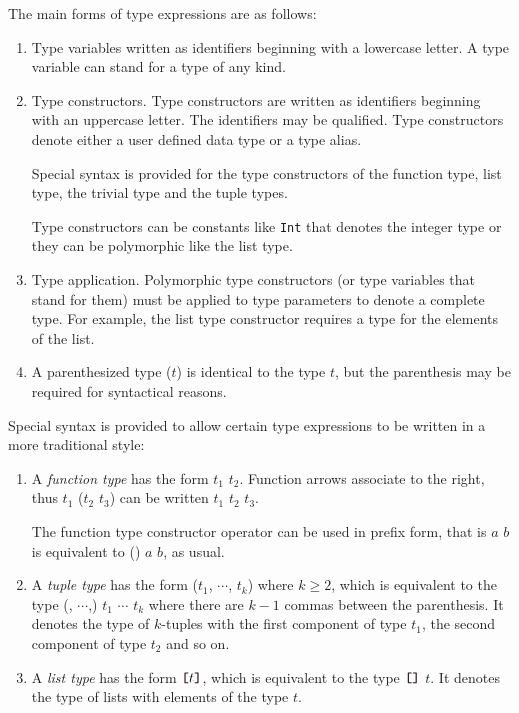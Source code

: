 The main forms of type expressions are as follows:

\begin{enumerate}
\item Type variables written as identifiers beginning with a lowercase letter.  A type variable can stand for a type of any kind.
\item Type constructors. Type constructors are written as identifiers beginning with an uppercase letter. The identifiers may be qualified. Type constructors denote either a user defined data type or a type alias.

Special syntax is provided for the type constructors of the function type, list type, the trivial type and the tuple types.

Type constructors can be constants like \texttt{Int} that denotes the integer type or they can be polymorphic like the list type.
\item Type application. Polymorphic type constructors (or type variables that stand for them) must be applied to type parameters to denote a complete type. For example, the list type constructor requires a type for the elements of the list. 
\item A parenthesized type ($t$) is identical to the type $t$, but the parenthesis may be required for syntactical reasons.
\end{enumerate}

Special syntax is provided to allow certain type expressions to be written in a more traditional style:

\begin{enumerate}
\item A \emph{function type} has the form $t_1$ \arrow{} $t_2$. Function arrows associate to the right, thus $t_1$ \arrow{} ($t_2$ \arrow{} $t_3$) can be written $t_1$ \arrow{} $t_2$ \arrow{} $t_3$.

The function type constructor operator can be used in prefix form, that is $a$ \arrow{} $b$ is equivalent to (\arrow{}) $a$ $b$, as usual.

\item A \emph{tuple type} has the form ($t_1$, $\cdots$, $t_k$) where $k\ge{}2$, which is equivalent to the type (, $\cdots$,) $t_1$ $\cdots$ $t_k$ where there are $k-1$ commas between the parenthesis.
It denotes the type of $k$-tuples with the first component of type $t_1$, the second component of type $t_2$ and so on.
\item A \emph{list type} has the form $\bracka{}t\brackz{}$, which is equivalent to the type $\bracka{}\brackz{}$ $t$. It denotes the type of lists with elements of the type $t$.
\end{enumerate}

